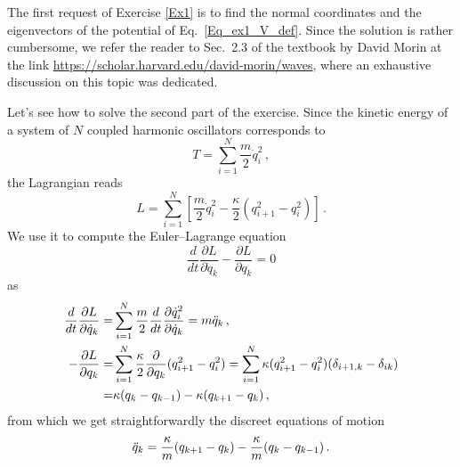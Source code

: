 \begin{sol}
    The first request of Exercise \ref{Ex1} is to find the normal coordinates and the eigenvectors of the potential of Eq.~\eqref{Eq_ex1_V_def}. Since the solution is rather cumbersome, we refer the reader to Sec.~2.3 of the textbook by David Morin at the link \url{https://scholar.harvard.edu/david-morin/waves}, where an exhaustive discussion on this topic was dedicated.

    Let's see how to solve the second part of the exercise. Since the kinetic energy of a system of $N$ coupled harmonic oscillators corresponds to 
    \begin{equation}
        T =\sum_{i=1}^{N} \frac{m}{2} \dot{q}_i^2 \, ,
    \end{equation}
    the Lagrangian reads
    \begin{equation}
        L = \sum_{i=1}^{N} \left[\frac{m}{2} \dot{q}_i^2 - \frac{\kappa}{2} (q_{i+1}^2 - q_i^2)\right] \, . 
    \end{equation}
    We use it to compute the Euler–Lagrange equation
    \begin{equation}
        \frac{d}{dt} \frac{\partial L}{\partial \dot{q}_k} - \frac{\partial L}{\partial q_k} = 0 
    \end{equation}
    as
    \begin{equation}
    \begin{split}
        \frac{d}{dt} \frac{\partial L}{\partial \dot{q}_k} 
        = & \sum_{i=1}^{N} \frac{m}{2} \frac{d}{dt} \frac{\partial \dot{q}_i^2}{\partial \dot{q}_k} = m \Ddot{q}_k \, , \\
        - \frac{\partial L}{\partial q_k} = & \sum_{i=1}^{N} \frac{\kappa}{2} \frac{\partial}{\partial q_k} (q_{i+1}^2 - q_i^2) = \sum_{i=1}^{N} \kappa (q_{i+1}^2 - q_i^2) (\delta_{i+1,k} - \delta_{ik}) \\
        = &  \kappa (q_k - q_{k-1}) - \kappa(q_{k+1} - q_k) \, , 
    \end{split}
    \end{equation}
    from which we get straightforwardly the discreet equations of motion
    \begin{equation}
        \Ddot{q}_k = \frac{\kappa}{m} (q_{k+1} - q_k) - \frac{\kappa}{m} (q_k - q_{k-1}) \, .
        \label{Eq:question_one_discrete_eom}
    \end{equation}
    

\end{sol}
